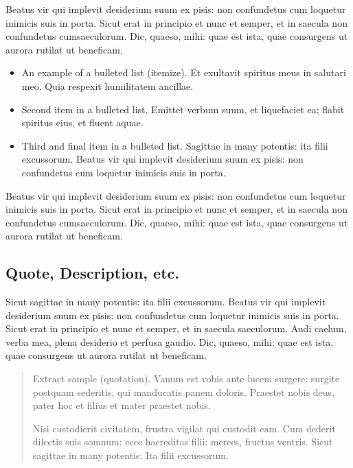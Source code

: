 \documentclass[pdftex,crc]{ios-book}
\begin{document}
Beatus vir qui implevit desiderium
suum ex pisis: non confundetus cum loquetur inimicis suis in porta.
Sicut erat in principio et nunc et semper, et in saecula non
confundetus cumsaeculorum. Dic, quaeso, mihi: quae est ista, quae
consurgens ut aurora rutilat ut beneficam.

\begin{itemize}
\item An example of a bulleted list (itemize). Et exultavit spiritus meus in salutari meo.
Quia respexit humilitatem ancillae.

\item Second item in a bulleted list. Emittet verbum suum, et liquefaciet
ea; flabit spiritus eius, et fluent aquae.

\item Third and final item in a bulleted list. Sagittae in many potentis:
ita filii excussorum.  Beatus vir qui implevit desiderium suum ex
pisis: non confundetus cum loquetur inimicis suis in porta.
\end{itemize}

Beatus vir qui implevit desiderium
suum ex pisis: non confundetus cum loquetur inimicis suis in porta.
Sicut erat in principio et nunc et semper, et in saecula non
confundetus cumsaeculorum. Dic, quaeso, mihi: quae est ista, quae
consurgens ut aurora rutilat ut beneficam.

\subsection{Quote, Description, etc.}

Sicut sagittae in many potentis: ita filii excussorum. Beatus vir qui
implevit desiderium suum ex pisis: non confundetus cum loquetur inimicis
suis in porta.  Sicut erat in principio et nunc et semper, et in saecula
saeculorum. Audi caelum, verba mea, plena desiderio et perfusa gaudio.
Dic, quaeso, mihi: quae est ista, quae consurgens ut aurora rutilat ut
beneficam.

\begin{quotation}
Extract sample (quotation). Vanum est vobis ante lucem surgere: surgite postquam
sederitis, qui manducatis panem doloris. Praestet nobis deus, pater
hoc et filius et mater praestet nobis.

Nisi custodierit civitatem,
frustra vigilat qui custodit eam. Cum dederit dilectis suis somnum:
ecce haereditas filii: merces, fructus ventris. Sicut sagittae in
many potentis: Ita filii excussorum.
\end{quotation}
\end{document}
